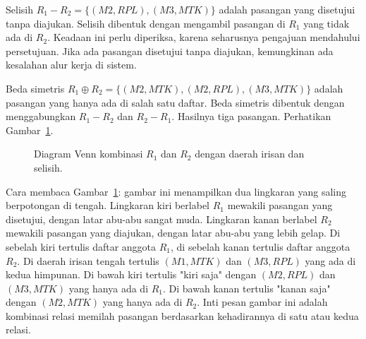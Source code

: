 \documentclass[11pt,a4paper]{article}
\begin{document}
Selisih $R_1-R_2=\{(M2,RPL),(M3,MTK)\}$ adalah pasangan yang disetujui tanpa diajukan. Selisih dibentuk dengan mengambil pasangan di $R_1$ yang tidak ada di $R_2$. Keadaan ini perlu diperiksa, karena seharusnya pengajuan mendahului persetujuan. Jika ada pasangan disetujui tanpa diajukan, kemungkinan ada kesalahan alur kerja di sistem.

Beda simetris $R_1 \oplus R_2=\{(M2,MTK),(M2,RPL),(M3,MTK)\}$ adalah pasangan yang hanya ada di salah satu daftar. Beda simetris dibentuk dengan menggabungkan $R_1-R_2$ dan $R_2-R_1$. Hasilnya tiga pasangan. Perhatikan Gambar~\ref{fig:kombinasi}.

\begin{figure}[H]
	\centering
	\caption{Diagram Venn kombinasi $R_1$ dan $R_2$ dengan daerah irisan dan selisih.}
	\label{fig:kombinasi}
\end{figure}

Cara membaca Gambar~\ref{fig:kombinasi}: gambar ini menampilkan dua lingkaran yang saling berpotongan di tengah. Lingkaran kiri berlabel $R_1$ mewakili pasangan yang disetujui, dengan latar abu-abu sangat muda. Lingkaran kanan berlabel $R_2$ mewakili pasangan yang diajukan, dengan latar abu-abu yang lebih gelap. Di sebelah kiri tertulis daftar anggota $R_1$, di sebelah kanan tertulis daftar anggota $R_2$. Di daerah irisan tengah tertulis $(M1,MTK)$ dan $(M3,RPL)$ yang ada di kedua himpunan. Di bawah kiri tertulis "kiri saja" dengan $(M2,RPL)$ dan $(M3,MTK)$ yang hanya ada di $R_1$. Di bawah kanan tertulis "kanan saja" dengan $(M2,MTK)$ yang hanya ada di $R_2$. Inti pesan gambar ini adalah kombinasi relasi memilah pasangan berdasarkan kehadirannya di satu atau kedua relasi.
\end{document}
